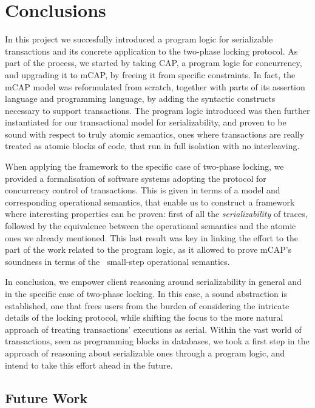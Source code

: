 \chapter{Conclusions}

In this project we succesfully introduced a program logic for serializable transactions and its concrete application to the two-phase locking protocol. As part of the process, we started by taking CAP, a program logic for concurrency, and upgrading it to mCAP, by freeing it from specific constraints. In fact, the mCAP model was reformulated from scratch, together with parts of its assertion language and programming language, by adding the syntactic constructs necessary to support transactions. The program logic introduced was then further instantiated for our transactional model for serializability, and proven to be sound with respect to truly atomic semantics, ones where transactions are really treated as atomic blocks of code, that run in full isolation with no interleaving.

When applying the framework to the specific case of two-phase locking, we provided a formalisation of software systems adopting the protocol for concurrency control of transactions. This is given in terms of a model and corresponding operational semantics, that enable us to construct a framework where interesting properties can be proven: first of all the \textit{serializability} of traces, followed by the equivalence between the operational semantics and the atomic ones we already mentioned. This last result was key in linking the effort to the part of the work related to the program logic, as it allowed to prove mCAP's soundness in terms of the \tpl\ small-step operational semantics.

In conclusion, we empower client reasoning around serializability in general and in the specific case of two-phase locking. In this case, a sound abstraction is established, one that frees users from the burden of considering the intricate details of the locking protocol, while shifting the focus to the more natural approach of treating transactions' executions as serial. Within the vast world of transactions, seen as programming blocks in databases, we took a first step in the approach of reasoning about serializable ones through a program logic, and intend to take this effort ahead in the future.

\section{Future Work}

